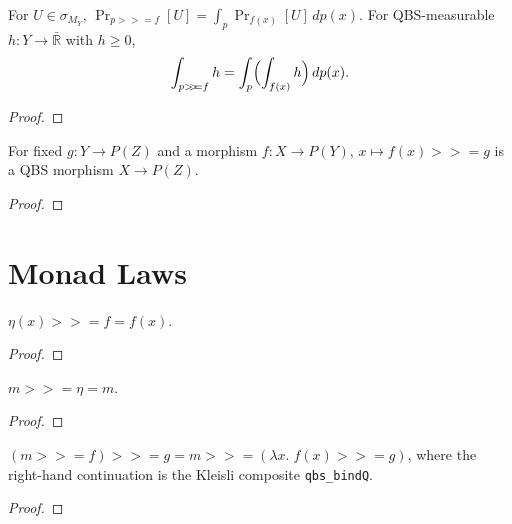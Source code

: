 \begin{lemma}\label{lem:qbs_bind_event}
  \rocqok
  For $U \in \sigma_{M_Y}$,
  $\Pr_{p \mathbin{>\!\!>\!\!=} f}[U] =
  \int_p \Pr_{f(x)}[U]\, dp(x)$.
  For QBS-measurable $h : Y \to \bar{\mathbb{R}}$ with $h \geq 0$,
  \[
    \int_{p \mathbin{>\!\!>\!\!=} f} h
    = \int_p \Bigl(\int_{f(x)} h\Bigr)\, dp(x).
  \]
\end{lemma}
\begin{proof}\rocqok\end{proof}

\begin{lemma}\label{lem:qbs_morphism_bind}
  \rocqok
  For fixed $g : Y \to P(Z)$ and a morphism $f : X \to P(Y)$,
  $x \mapsto f(x) \mathbin{>\!\!>\!\!=} g$ is a QBS morphism
  $X \to P(Z)$.
\end{lemma}
\begin{proof}\rocqok\end{proof}


\section{Monad Laws}\label{sec:monad_laws}

\begin{theorem}\label{thm:qbs_bind_returnl}
  \rocqok
  $\eta(x) \mathbin{>\!\!>\!\!=} f = f(x)$.
\end{theorem}
\begin{proof}\rocqok\end{proof}

\begin{theorem}\label{thm:qbs_bind_returnr}
  \rocqok
  $m \mathbin{>\!\!>\!\!=} \eta = m$.
\end{theorem}
\begin{proof}\rocqok\end{proof}

\begin{theorem}[Associativity]\label{thm:qbs_bindA}
  \rocqok
  $(m \mathbin{>\!\!>\!\!=} f) \mathbin{>\!\!>\!\!=} g =
  m \mathbin{>\!\!>\!\!=} (\lambda x.\; f(x) \mathbin{>\!\!>\!\!=} g)$,
  where the right-hand continuation is the Kleisli composite
  \texttt{qbs\_bindQ}.
\end{theorem}
\begin{proof}\rocqok\end{proof}

